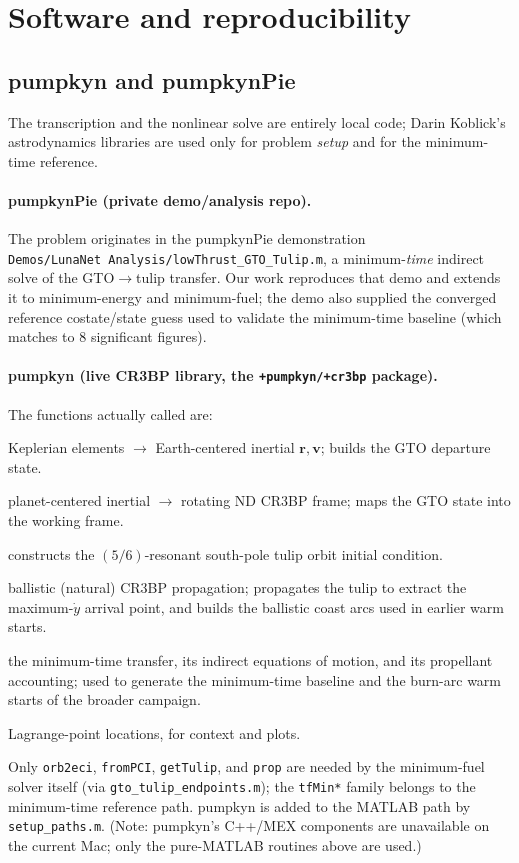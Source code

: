 \documentclass[11pt]{article}
\newcommand{\code}[1]{\texttt{#1}}
\newcommand{\vv}[1]{\boldsymbol{#1}}
\newcommand{\rvec}{\vv{r}}
\newcommand{\vvec}{\vv{v}}
\begin{document}
\section{Software and reproducibility}
\label{sec:software}

\subsection{pumpkyn and pumpkynPie}
The transcription and the nonlinear solve are entirely local code; Darin
Koblick's astrodynamics libraries are used only for problem \emph{setup} and for
the minimum-time reference.

\paragraph{pumpkynPie (private demo/analysis repo).} The problem originates in
the pumpkynPie demonstration \code{Demos/LunaNet\ Analysis/lowThrust\_GTO\_Tulip.m},
a minimum-\emph{time} indirect solve of the GTO$\to$tulip transfer. Our work
reproduces that demo and extends it to minimum-energy and minimum-fuel; the
demo also supplied the converged reference costate/state guess used to validate
the minimum-time baseline (which matches to 8 significant figures).

\paragraph{pumpkyn (live CR3BP library, the \code{+pumpkyn/+cr3bp} package).}
The functions actually called are:
\begin{description}[leftmargin=1.5em,itemsep=1pt]
\item[\code{cr3bp.orb2eci}] Keplerian elements $\to$ Earth-centered inertial
  $\rvec,\vvec$; builds the GTO departure state.
\item[\code{cr3bp.fromPCI}] planet-centered inertial $\to$ rotating ND CR3BP
  frame; maps the GTO state into the working frame.
\item[\code{cr3bp.getTulip}] constructs the $(5/6)$-resonant south-pole tulip
  orbit initial condition.
\item[\code{cr3bp.prop}] ballistic (natural) CR3BP propagation; propagates the
  tulip to extract the maximum-$\dot y$ arrival point, and builds the ballistic
  coast arcs used in earlier warm starts.
\item[\code{cr3bp.tfMin}, \code{cr3bp.tfMinEoM}, \code{cr3bp.tfMinProp}] the
  minimum-time transfer, its indirect equations of motion, and its propellant
  accounting; used to generate the minimum-time baseline and the burn-arc warm
  starts of the broader campaign.
\item[\code{cr3bp.lagrangePts}] Lagrange-point locations, for context and plots.
\end{description}
Only \code{orb2eci}, \code{fromPCI}, \code{getTulip}, and \code{prop} are needed
by the minimum-fuel solver itself (via \code{gto\_tulip\_endpoints.m}); the
\code{tfMin*} family belongs to the minimum-time reference path. pumpkyn is
added to the MATLAB path by \code{setup\_paths.m}. (Note: pumpkyn's C++/MEX
components are unavailable on the current Mac; only the pure-MATLAB routines
above are used.)
\end{document}
